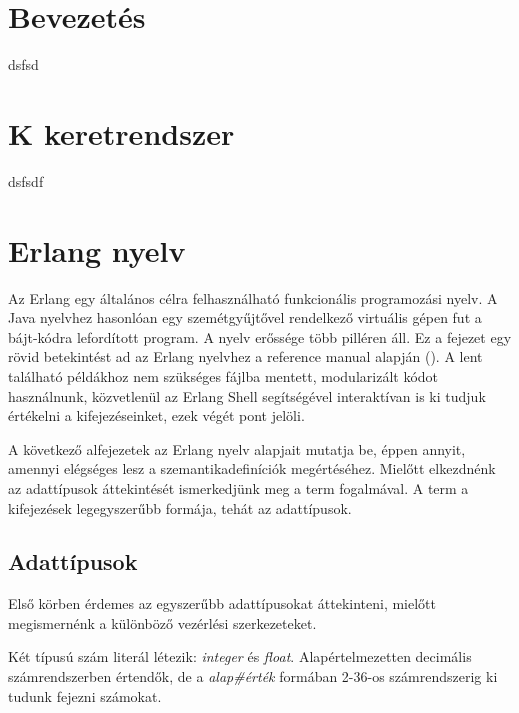\documentclass[twoside, a4paper, 12pt]{article}
\title{\CIM}
\author{\SZERZO}
\date{\VEDESEVE}
\begin{document}
\pagestyle{empty}


\cleardoublepage


\tableofcontents
\cleardoublepage

\pagestyle{plain}
\setcounter{page}{1}



\section{Bevezetés}
dsfsd

\section{K keretrendszer}
dsfsdf

\section{Erlang nyelv}
Az Erlang egy általános célra felhasználható funkcionális programozási nyelv. A Java nyelvhez hasonlóan egy szemétgyűjtővel rendelkező virtuális gépen fut a bájt-kódra lefordított program. A nyelv erőssége több pilléren áll. Ez a fejezet egy rövid betekintést ad az Erlang nyelvhez a reference manual alapján (\cite{RefMan}). A lent található példákhoz nem szükséges fájlba mentett, modularizált kódot használnunk, közvetlenül az Erlang Shell segítségével interaktívan is ki tudjuk értékelni a kifejezéseinket, ezek végét pont jelöli.

A következő alfejezetek az Erlang nyelv alapjait mutatja be, éppen annyit, amennyi elégséges lesz a szemantikadefiníciók megértéséhez. Mielőtt elkezdnénk az adattípusok áttekintését ismerkedjünk meg a term fogalmával. A term a kifejezések legegyszerűbb formája, tehát az adattípusok.

\subsection{Adattípusok}
Első körben érdemes az egyszerűbb adattípusokat áttekinteni, mielőtt megismernénk a különböző vezérlési szerkezeteket.

Két típusú szám literál létezik: \textit{integer} és \textit{float}. Alapértelmezetten decimális számrendszerben értendők, de a \textit{alap\#érték} formában 2-36-os számrendszerig ki tudunk fejezni számokat.
\end{document}
